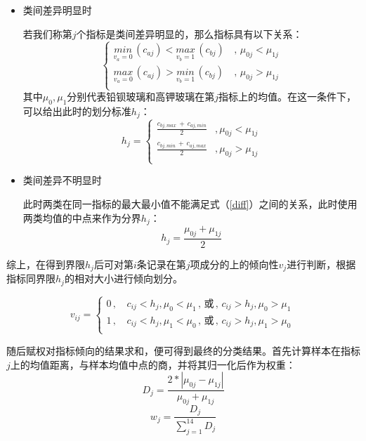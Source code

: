 \documentclass{my_paper}
\begin{document}
\begin{itemize}
  \item 类间差异明显时
  
  若我们称第$ j $个指标是类间差异明显的，那么指标具有以下关系：
  \begin{equation}
    \begin{cases}
      \underset{v_{a} = 0}{min} \, (c_{aj}) < \underset{v_{b} = 1}{max}\,(c_{bj}) &\,,\, \mu_{0j}<\mu_{1j}\\ 
      \underset{v_{a} = 0}{max} \, (c_{aj}) > \underset{v_{b} = 1}{min}\,(c_{bj}) &\,,\, \mu_{0j}>\mu_{1j}\\ 
    \end{cases}
  \label{diff}
  \end{equation}
  其中$ \mu_0,\mu_1 $分别代表铅钡玻璃和高钾玻璃在第$ j $指标上的均值。在这一条件下，可以给出此时的划分标准$ h_j $：
  \begin{equation}
  h_j=\begin{cases}
    \frac{c_{bj,max}\,+\,c_{aj,min}}{2}&, \mu_{0j}<\mu_{1j}\\
    \frac{c_{bj,min}\,+\,c_{aj,max}}{2}&, \mu_{0j}>\mu_{1j}\\
  \end{cases}
  \label{hj1}
  \end{equation}

  \item 类间差异不明显时
  
  此时两类在同一指标的最大最小值不能满足式（\ref{diff}）之间的关系，此时使用两类均值的中点来作为分界$ h_j $：
  \begin{equation}
  h_j = \frac{\mu_{0j}+\mu_{1j}}{2}
  \label{hj2}
  \end{equation}

\end{itemize}

综上，在得到界限$ h_j $后可对第$ i $条记录在第$ j $项成分的上的倾向性$ v_j $进行判断，根据指标同界限$h_j $的相对大小进行倾向划分。

\begin{equation}
v_{ij} =  \begin{cases}
  0 \,,&\, c_{ij}<h_j ,\mu_0<\mu_1 \,,\,\text{或} \,,\, c_{ij}>h_j ,\mu_0>\mu_1 \,\\
  1 \,,&\, c_{ij}<h_j ,\mu_1<\mu_0 \,,\,\text{或} \,,\, c_{ij}>h_j ,\mu_1>\mu_0 \,\\
\end{cases}
\label{vij}
\end{equation}

随后赋权对指标倾向的结果求和，便可得到最终的分类结果。首先计算样本在指标$j$上的均值距离，与样本均值中点的商，并将其归一化后作为权重：
\begin{equation}
D_j = \frac{2*|\mu_{0j}-\mu_{1j}|}{\mu_{0j}+\mu_{1j}}
\label{dj}
\end{equation}
\begin{equation}
w_j = \frac{D_j}{\sum\limits_{j=1}^{14} D_j}
\label{wj}
\end{equation}
\end{document}
